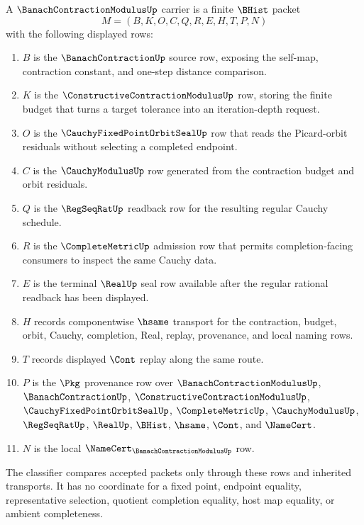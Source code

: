 \begin{definition}
\label{def:banach-contraction-modulus-carrier}
A $\BanachContractionModulusUp$ carrier is a finite $\BHist$ packet
$$
M=(B,K,O,C,Q,R,E,H,T,P,N)
$$
with the following displayed rows:
\begin{enumerate}
\item $B$ is the $\BanachContractionUp$ source row, exposing the self-map, contraction constant, and one-step distance comparison.
\item $K$ is the $\ConstructiveContractionModulusUp$ row, storing the finite budget that turns a target tolerance into an iteration-depth request.
\item $O$ is the $\CauchyFixedPointOrbitSealUp$ row that reads the Picard-orbit residuals without selecting a completed endpoint.
\item $C$ is the $\CauchyModulusUp$ row generated from the contraction budget and orbit residuals.
\item $Q$ is the $\RegSeqRatUp$ readback row for the resulting regular Cauchy schedule.
\item $R$ is the $\CompleteMetricUp$ admission row that permits completion-facing consumers to inspect the same Cauchy data.
\item $E$ is the terminal $\RealUp$ seal row available after the regular rational readback has been displayed.
\item $H$ records componentwise $\hsame$ transport for the contraction, budget, orbit, Cauchy, completion, Real, replay, provenance, and local naming rows.
\item $T$ records displayed $\Cont$ replay along the same route.
\item $P$ is the $\Pkg$ provenance row over $\BanachContractionModulusUp$, $\BanachContractionUp$, $\ConstructiveContractionModulusUp$, $\CauchyFixedPointOrbitSealUp$, $\CompleteMetricUp$, $\CauchyModulusUp$, $\RegSeqRatUp$, $\RealUp$, $\BHist$, $\hsame$, $\Cont$, and $\NameCert$.
\item $N$ is the local $\NameCert_{\BanachContractionModulusUp}$ row.
\end{enumerate}
The classifier compares accepted packets only through these rows and inherited transports. It has no coordinate for a fixed point, endpoint equality, representative selection, quotient completion equality, host map equality, or ambient completeness.
\end{definition}

